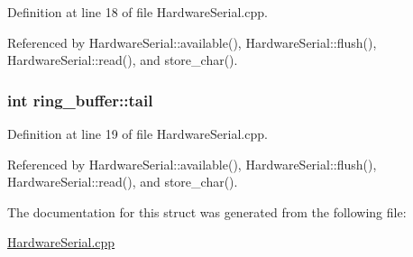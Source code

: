 Definition at line 18 of file HardwareSerial.cpp.



Referenced by HardwareSerial::available(), HardwareSerial::flush(), HardwareSerial::read(), and store\_\-char().

\hypertarget{structring__buffer_a4d06965736f37f64f15bbd0ca9457771}{
\subsubsection[{tail}]{\setlength{\rightskip}{0pt plus 5cm}int {\bf ring\_\-buffer::tail}}}
\label{structring__buffer_a4d06965736f37f64f15bbd0ca9457771}


Definition at line 19 of file HardwareSerial.cpp.



Referenced by HardwareSerial::available(), HardwareSerial::flush(), HardwareSerial::read(), and store\_\-char().



The documentation for this struct was generated from the following file:\begin{DoxyCompactItemize}
\item 
\hyperlink{_hardware_serial_8cpp}{HardwareSerial.cpp}\end{DoxyCompactItemize}
